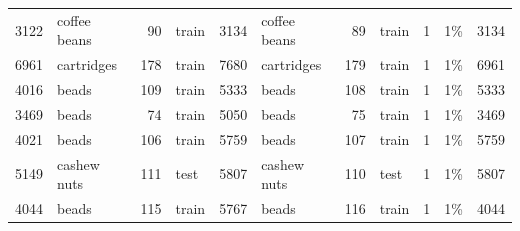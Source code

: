 \begin{tabular}{rlrlrlrlrrc}
3122 & coffee beans & 90 & train & 3134 & coffee beans & 89 & train & 1 &1\% & 3134\\
6961 & cartridges & 178 & train & 7680 & cartridges & 179 & train & 1 &1\% & 6961\\
4016 & beads & 109 & train & 5333 & beads & 108 & train & 1 &1\% & 5333\\
3469 & beads & 74 & train & 5050 & beads & 75 & train & 1 &1\% & 3469\\
4021 & beads & 106 & train & 5759 & beads & 107 & train & 1 &1\% & 5759\\
5149 & cashew nuts & 111 & test & 5807 & cashew nuts & 110 & test & 1 &1\% & 5807\\
4044 & beads & 115 & train & 5767 & beads & 116 & train & 1 &1\% & 4044\\
\bottomrule
\end{tabular}
